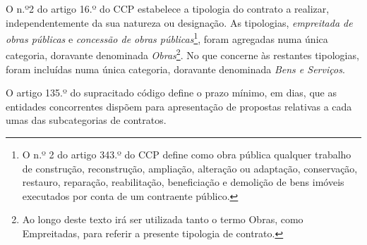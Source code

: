 


O n.º2 do artigo 16.º do CCP estabelece a tipologia do contrato a realizar, independentemente da sua natureza ou designação. As tipologias, \textit{empreitada de obras públicas} e \textit{concessão de obras públicas}\footnote{O n.º 2 do artigo 343.º do CCP define como obra pública qualquer trabalho de construção, reconstrução, ampliação, alteração ou adaptação, conservação, restauro, reparação, reabilitação, beneficiação e demolição de bens imóveis executados por conta de um contraente público.}, foram agregadas numa única categoria, doravante denominada \textit{Obras}\footnote{Ao longo deste texto irá ser utilizada tanto o termo Obras, como Empreitadas, para referir a presente tipologia de contrato.}. 
No que concerne às restantes tipologias, foram incluídas numa única categoria, doravante denominada \textit{Bens e Serviços}.

O artigo 135.º do supracitado código define o prazo mínimo, em dias, que as entidades concorrentes dispõem para apresentação de propostas relativas a cada umas das subcategorias de contratos. 

